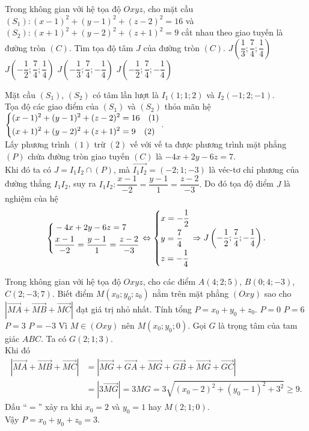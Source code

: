 \begin{ex}%
	Trong không gian với hệ tọa độ $Oxyz$, cho mặt cầu $(S_1) \colon (x-1)^2+(y-1)^2+(z-2)^2 =16$ và $(S_2) \colon (x+1)^2+(y-2)^2+(z+1)^2=9$ cắt nhau theo giao tuyến là đường tròn $(C)$. Tìm tọa độ tâm $J$ của đường tròn $(C).$
	\choice
	{$J\left( \dfrac{1}{3};\dfrac{7}{4}; \dfrac{1}{4}\right)$}
	{$J\left( -\dfrac{1}{2};\dfrac{7}{4}; \dfrac{1}{4}\right)$}
	{$J\left( -\dfrac{1}{3};\dfrac{7}{4}; -\dfrac{1}{4}\right)$}
	{\True $J\left( -\dfrac{1}{2};\dfrac{7}{4}; -\dfrac{1}{4}\right)$}
	\loigiai
	{ Mặt cầu $(S_1)$, $(S_2)$ có tâm lần lượt là $I_1(1;1;2)$ và $I_2(-1;2;-1)$.\\
		Tọa độ các giao điểm của $(S_1)$ và $(S_2)$ thỏa mãn hệ 
		$\left\{\begin{aligned}& (x-1)^2+(y-1)^2+(z-2)^2 =16 \quad (1)\\&(x+1)^2+(y-2)^2+(z+1)^2=9 \quad (2)\end{aligned}\right.. $\\
		Lấy phương trình $(1)$ trừ $(2)$ vế với vế ta được phương trình mặt phẳng $(P)$ chứa đường tròn giao tuyến $(C)$ là $-4x +2y -6z =7.$\\
		Khi đó ta có $J=I_1I_2\cap (P)$, mà $\vec{I_1I_2} =(-2;1;-3)$ là véc-tơ chỉ phương của đường thẳng $I_1I_2$, suy ra $I_1I_2 \colon \dfrac{x-1}{-2} =\dfrac{y-1}{1} =\dfrac{z-2}{-3}.$ Do đó tọa độ điểm $J$ là nghiệm của hệ 
		$$ \left\{\begin{aligned}&-4x +2y -6z =7\\&   \dfrac{x-1}{-2} =\dfrac{y-1}{1} =\dfrac{z-2}{-3}\end{aligned}\right. \Leftrightarrow \left\{\begin{aligned}& x=-\dfrac{1}{2}\\& y= \dfrac{7}{4}\\&z=-\dfrac{1}{4}\end{aligned}\right. \Rightarrow J\left( -\dfrac{1}{2};\dfrac{7}{4}; -\dfrac{1}{4}\right).$$
		
		
	}
\end{ex}

\begin{ex}%
	Trong không gian với hệ tọa độ $Oxyz$, cho các điểm $A(4;2;5)$, $B(0;4;-3)$, $C(2;-3;7)$. Biết điểm $M(x_0;y_0;z_0)$ nằm trên mặt phẳng $(Oxy)$ sao cho $\left| \vec{MA} + \vec{MB} + \vec{MC} \right|$ đạt giá trị nhỏ nhất. Tính tổng $P = x_0 + y_0 + z_0$.
	\choice
	{$P = 0$}
	{$P = 6$}
	{\True $P = 3$}
	{$P = -3$}
	\loigiai
	{
		Vì $M \in (Oxy)$ nên $M(x_0;y_0;0)$.
		Gọi $G$ là trọng tâm của tam giác $ABC$.
		Ta có $G(2;1;3)$.\\
		Khi đó
		\begin{align*}
		\left| \vec{MA} + \vec{MB} + \vec{MC} \right| & = \left| \vec{MG} + \vec{GA} + \vec{MG} + \vec{GB} + \vec{MG} + \vec{GC} \right| \\
		& = \left| 3 \vec{MG} \right| = 3MG = 3\sqrt{(x_0 - 2)^2 + (y_0 - 1)^2 + 3^2} \geq 9.
		\end{align*}
		Dấu ``$=$'' xảy ra khi $x_0 = 2$ và $y_0 = 1$ hay $M(2;1;0)$.\\
		Vậy $P = x_0 + y_0 + z_0 = 3$.
	}
\end{ex}

